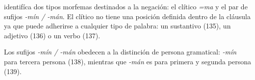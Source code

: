 \textcolor{MidnightBlue}{\citet{kakataibo}} identifíca dos tipos morfemas destinados a la negación: el clítico {\setmainfont{Charis SIL} \textit{=ma}} y el par de sufijos {\setmainfont{Charis SIL} \textit{-mín / -mán}}. El clítico no tiene una posición definida dentro de la cláusula ya que puede adherirse a cualquier tipo de palabra: un sustantivo (135), un adjetivo (136) o un verbo (137).

Los sufijos {\setmainfont{Charis SIL} \textit{-mín / -mán}} obedecen a la distinción de persona gramatical: {\setmainfont{Charis SIL} \textit{-mín}} para tercera persona (138), mientras que {\setmainfont{Charis SIL} \textit{-mán}} es para primera y segunda persona (139).